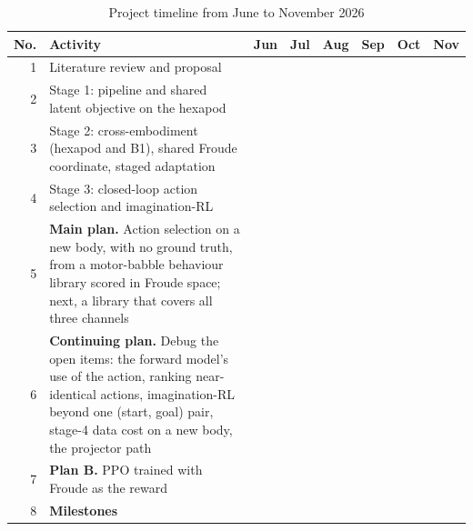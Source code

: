 \begin{table}[H]
\centering
\captionsetup{width=\linewidth, justification=centering}
\caption{Project timeline from June to November 2026}
\label{tab:project-timeline-ours}
\vspace{0.2cm}
\footnotesize
\setlength{\tabcolsep}{1.5pt}
\renewcommand{\arraystretch}{1.6}
\begin{tabular}{|N|p{5.7cm}|*{6}{M|}}
\hline
{}
\textbf{No.} & \textbf{Activity}
 & \textbf{Jun} & \textbf{Jul} & \textbf{Aug} & \textbf{Sep} & \textbf{Oct} & \textbf{Nov} \\
\hline

1 & Literature review and proposal
 &  &  & & & & \\
\hline

2 & Stage 1: pipeline and shared latent objective on the hexapod
 & & &  & & & \\
\hline

3 & Stage 2: cross-embodiment (hexapod and B1), shared Froude coordinate,
    staged adaptation
 & & &  &  & & \\
\hline

4 & Stage 3: closed-loop action selection and imagination-RL
 & & &  &  & & \\
\hline

5 & \textbf{Main plan.} Action selection on a new body, with no ground truth,
    from a motor-babble behaviour library scored in Froude space; next, a
    library that covers all three channels
 & & & &  &  &  \\
\hline

6 & \textbf{Continuing plan.} Debug the open items: the forward model's use of
    the action, ranking near-identical actions, imagination-RL beyond one
    (start, goal) pair, stage-4 data cost on a new body, the projector path
 & & & &  &  &  \\
\hline

7 & \textbf{Plan B.} PPO trained with Froude as the reward
 & & & &  &  &  \\
\hline

8 & \textbf{Milestones}
 & &  & &  & &  \\
\hline
\end{tabular}


\end{table}
